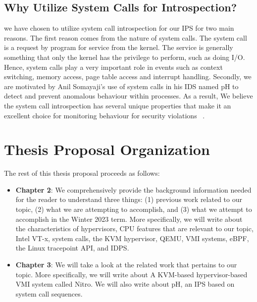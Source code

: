 \documentclass{report}
\begin{document}
\begin{spacing}{1.5}
\subsection{Why Utilize System Calls for Introspection?}

{\large
we have chosen to utilize system call introspection for our IPS for two main reasons. The first reason comes from the nature of system calls. The system call is a request by program for service from the kernel. The service is generally something that only the kernel has the privilege to perform, such as doing I/O. Hence, system calls play a very important role in events such as context switching, memory access, page table access and interrupt handling. Secondly, we are motivated by Anil Somayaji's use of system calls in his IDS named pH to detect and prevent anomalous behaviour within processes. As a result, We believe the system call introspection has several unique properties that make it an excellent choice for monitoring behaviour for security violations ~\cite{somayaji2002operating}.
\newline
}


















\section{Thesis Proposal Organization}
{\large
The rest of this thesis proposal proceeds as follows:

\begin{itemize}
    \item \textbf{Chapter 2}: We comprehensively provide the background information needed for the reader to understand three things: (1) previous work related to our topic, (2) what we are attempting to accomplish, and (3) what we attempt to accomplish in the Winter 2023 term. More specifically, we will write about the characteristics of hypervisors, CPU features that are relevant to our topic, Intel VT-x, system calls, the KVM hypervisor, QEMU, VMI systems, eBPF, the Linux tracepoint API, and IDPS.

    \item \textbf{Chapter 3}: We will take a look at the related work that pertains to our topic. More specifically, we will write about A KVM-based hypervisor-based VMI system called Nitro. We will also write about pH, an IPS based on system call sequences.


\end{itemize}}
\end{spacing}
\end{document}
